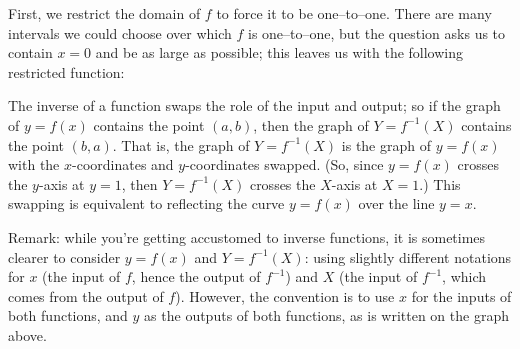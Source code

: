 \begin{solution}
First, we restrict the domain of $f$ to force it to be one--to--one. There are many intervals we could choose over which $f$ is one--to--one, but the question asks us to contain $x=0$ and be as large as possible; this leaves us with the following restricted function:
\begin{center}\end{center}
The inverse of a function swaps the role of the input and output; so if the graph of $y=f(x)$ contains the point $(a,b)$, then the graph of $Y=f^{-1}(X)$ contains the point $(b,a)$. That is, the graph of $Y=f^{-1}(X)$ is the graph of $y=f(x)$ with the $x$-coordinates and $y$-coordinates swapped. (So, since $y=f(x)$ crosses the $y$-axis at $y=1$, then $Y=f^{-1}(X)$ crosses the $X$-axis at $X=1$.) This swapping is equivalent to reflecting the curve $y=f(x)$ over the line $y=x$.

\begin{center}\end{center}

Remark: while you're getting accustomed to inverse functions, it is sometimes clearer to consider $y=f(x)$ and $Y=f^{-1}(X)$: using slightly different notations for $x$ (the input of $f$, hence the output of $f^{-1}$) and $X$ (the input of $f^{-1}$, which comes from the output of $f$). However, the convention is to use $x$ for the inputs of both functions, and $y$ as the outputs of both functions, as is written on the graph above.
\end{solution}




